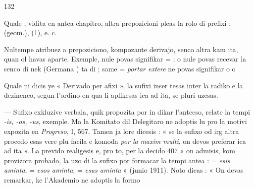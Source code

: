 \begin{VUpage}[136]{132}

\VUsaut{4.22mm}

Quale , vidita en antea chapitro, altra prepozicioni\nl
pleas la rolo di prefixi : \cc
{} (geom.),  (1), \cc
{} e. c.

Nultempe atribuez a prepoziciono, kompozante derivajo,\nl
senco altra kam ita, quan ol havas aparte. Exemple, \nl
nule povas signifikar  = ; \nl
o  nule povas recevar la senco di  nek\nl
{} (Germana ) ta di ; same\nl
{} = \textit{portar extere} ne povas signifikar o  o\nl
{}

\VUsaut{3.40mm}
\VUsaut{4.24mm}

Quale ni dicis ye « Derivado per afixi », la sufixi inser\cc
tesas inter la radiko e la dezinenco, segun l'ordino en qua\nl
li aplikesas ica ad ita, se pluri uzesas.

 --- Sufixo exkluzive verbala, quik propozita por in\cc
dikar l'anteeso, relate la tempi \textit{-is, -os, -us}, exemple. Ma la\nl
Komitato dil Delegitaro ne adoptis lu pro la motivi expozita\nl
en \textit{Progreso}, I, 567. Tamen ja lore dicesis : « se la sufixo \nl
od irg altra procedo esas vere plu facila e komoda \textit{por la}\nl
\textit{maxim multi}, on devos preferar ica ad ita ». La prevido\nl
realigesis e, pro to, per la decido 407 « on admisis, kom\nl
provizora probado, la uzo di la sufixo  por formacar la\nl
tempi antea :  = \textit{esis aminta},  = \textit{esos aminta},\nl
{} = \textit{esus aminta} » (junio 1911). Noto dicas : « On\nl
devas remarkar, ke l'Akademio ne adoptis la formo\parplein
\end{VUpage}

